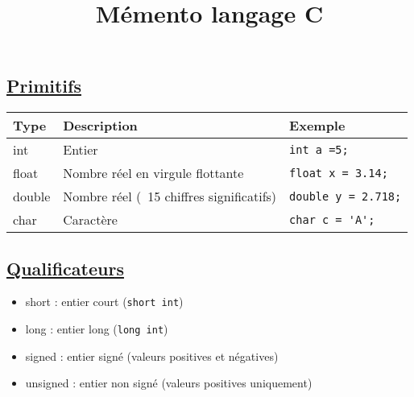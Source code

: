 \documentclass[a3paper,12pt]{article}
\title{{\Huge \textbf{Mémento langage C}}}
\date{}
\makeatletter
\renewcommand{\maketitle}{
  \begin{center}
    \vspace*{-1.5cm} %
    {\LARGE \@title \par}
    \vspace{0.5em}
    {\large \@author \par}
    \vspace{0.5em}
    {\small \@date \par}
    \vspace{1em}
  \end{center}
}
\makeatother
\begin{document}
\maketitle
\vspace*{-1.5em}
\noindent
\begin{minipage}[t]{0.5\textwidth}
\vspace{0pt}
\begin{tcolorbox}[title=Types de base, fonttitle=\large, top=0pt, bottom=5pt, boxsep=1pt, colback=white,
  colframe=blue!90!black, 
  colbacktitle=blue!90!black,
  coltitle=white,]
  
\vspace{0.5em}
\subsection*{{\small \underline{Primitifs}}}
\begin{tabular}{|l|l|l|}
\hline
\textbf{Type} & \textbf{Description} & \textbf{Exemple}\\
\hline
int & Entier & \lstinline|int a =5;| \\
\hline
float & Nombre réel en virgule flottante & \lstinline|float x = 3.14;|\\
\hline
double & Nombre réel (~15 chiffres significatifs) & \lstinline|double y = 2.718;|\\
\hline
char & Caractère & \lstinline|char c = 'A';|\\
\hline
\end{tabular}

\subsection*{{\small \underline{Qualificateurs}}}
\begin{itemize}
\item short : entier court (\lstinline|short int|)
\item long : entier long (\lstinline|long int|)
\item signed : entier signé (valeurs positives et négatives)
\item unsigned : entier non signé (valeurs positives uniquement)
\end{itemize}
\end{tcolorbox}

\begin{tcolorbox}[title=Variables, fonttitle=\large, top=0pt, bottom=3pt, boxsep=1pt, colback=white,
  colframe=palegreen, 
  colbacktitle=palegreen,
  coltitle=white,]
  

\end{tcolorbox}
\end{minipage}
\end{document}
